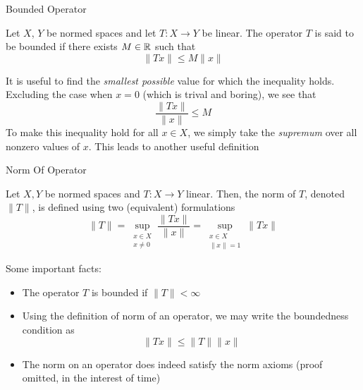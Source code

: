 \documentclass[10pt]{beamer}
\begin{document}
		\begin{frame}{Bounded Operator}
				\begin{definition}
						Let $X$, $Y$ be normed spaces and let $T: X\to Y$ be linear. The operator $T$ is said to be \alert{bounded} if there exists $M\in\mathbb{R}$ such that 
						\begin{equation*}
								\|Tx\| \leq M\|x\|
						\end{equation*}
				\end{definition}

				It is useful to find the \emph{smallest possible} value for which the inequality holds. Excluding the case when $x = 0$ (which is trival and boring), we see that 
				\begin{equation*}
						\frac{\|Tx\|}{\|x\|} \leq M
				\end{equation*}
				To make this inequality hold for all $x\in X$, we simply take the \emph{supremum} over all nonzero values of $x$. This leads to another useful definition 
		\end{frame}

		\begin{frame}{Norm Of Operator}
				\begin{definition}
						Let $X,Y$ be normed spaces and $T: X\to Y$ linear. Then, the \alert{norm} of $T$, denoted $\|T\|$, is defined using two (equivalent) formulations 
						\begin{equation*}
								\|T\| = \sup_{\substack{x\in X \\ x \neq 0}} \frac{\|Tx\|}{\|x\|} = \sup_{\substack{x\in X \\ \|x\| = 1}} \|Tx\|
						\end{equation*}
				\end{definition}
				Some important facts: 
				\begin{itemize}
						\item The operator $T$ is bounded if $\|T\| < \infty$ 
						\item Using the definition of norm of an operator, we may write the boundedness condition as 
								\begin{equation*}
										\|Tx\| \leq \|T\|\|x\|
								\end{equation*}
						\item The norm on an operator does indeed satisfy the norm axioms (proof omitted, in the interest of time)
				\end{itemize}
		\end{frame}
\end{document}
